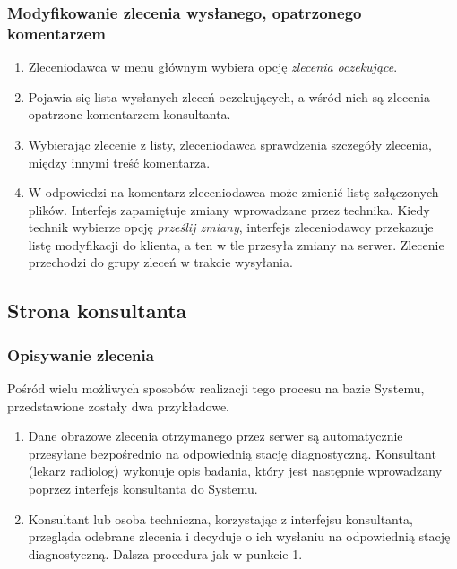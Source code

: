 \documentclass[a4paper]{article}
\begin{document}
\subsubsection{Modyfikowanie zlecenia wysłanego, opatrzonego komentarzem}

\begin{enumerate}
  \item Zleceniodawca w menu głównym wybiera opcję \emph{zlecenia oczekujące}.
  \item Pojawia się lista wysłanych zleceń oczekujących, a wśród nich są zlecenia opatrzone
  komentarzem konsultanta.
  \item Wybierając zlecenie z listy, zleceniodawca sprawdzenia szczegóły zlecenia, między
  innymi treść komentarza.
  \item W odpowiedzi na komentarz zleceniodawca może zmienić listę załączonych plików.
  Interfejs zapamiętuje zmiany wprowadzane przez technika. Kiedy technik wybierze opcję
  \emph{prześlij zmiany}, interfejs zleceniodawcy przekazuje listę modyfikacji do
  klienta, a ten w tle przesyła zmiany na serwer. Zlecenie przechodzi do grupy zleceń w
  trakcie wysyłania.
\end{enumerate}

\subsection{Strona konsultanta}

\subsubsection{Opisywanie zlecenia}

Pośród wielu możliwych sposobów realizacji tego procesu na bazie Systemu, przedstawione
zostały dwa przykładowe. 

\begin{enumerate}
  \item Dane obrazowe zlecenia otrzymanego przez serwer są automatycznie przesyłane
  bezpośrednio na odpowiednią stację diagnostyczną. Konsultant (lekarz radiolog) wykonuje
  opis badania, który jest następnie wprowadzany poprzez interfejs konsultanta do Systemu.
  \item Konsultant lub osoba techniczna, korzystając z interfejsu konsultanta, przegląda
  odebrane zlecenia i decyduje o ich wysłaniu na odpowiednią stację diagnostyczną. Dalsza
  procedura jak w punkcie 1.
\end{enumerate}
\end{document}
